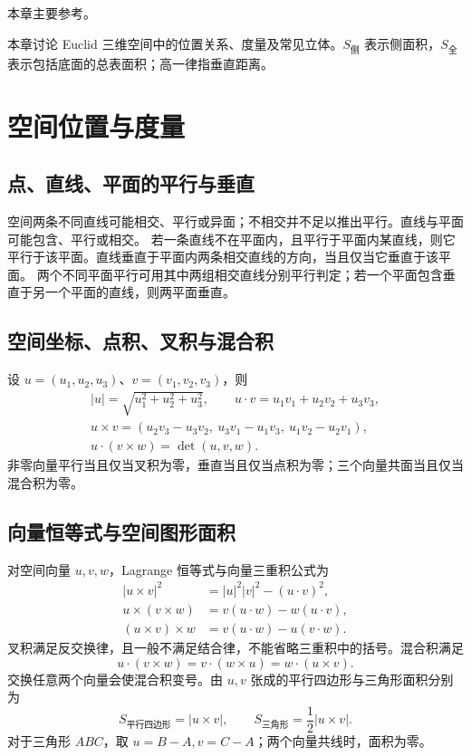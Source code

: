 \documentclass[../main.tex]{subfiles}
\begin{document}
本章主要参考\cite{euclid,geometry,matrix}。

本章讨论 Euclid 三维空间中的位置关系、度量及常见立体。$S_{\text{侧}}$ 表示侧面积，$S_{\text{全}}$ 表示包括底面的总表面积；高一律指垂直距离。
\section{空间位置与度量}
\subsection{点、直线、平面的平行与垂直}
空间两条不同直线可能相交、平行或异面；不相交并不足以推出平行。直线与平面可能包含、平行或相交。
若一条直线不在平面内，且平行于平面内某直线，则它平行于该平面。直线垂直于平面内两条相交直线的方向，当且仅当它垂直于该平面。
两个不同平面平行可用其中两组相交直线分别平行判定；若一个平面包含垂直于另一个平面的直线，则两平面垂直。
\subsection{空间坐标、点积、叉积与混合积}
设 $u=(u_1,u_2,u_3)$、$v=(v_1,v_2,v_3)$，则
\begin{gather*}
|u|=\sqrt{u_1^2+u_2^2+u_3^2},\qquad u\cdot v=u_1v_1+u_2v_2+u_3v_3,\\
u\times v=(u_2v_3-u_3v_2,\ u_3v_1-u_1v_3,\ u_1v_2-u_2v_1),\\
u\cdot(v\times w)=\det(u,v,w).
\end{gather*}
非零向量平行当且仅当叉积为零，垂直当且仅当点积为零；三个向量共面当且仅当混合积为零。
\subsection{向量恒等式与空间图形面积}
对空间向量 $u,v,w$，Lagrange 恒等式与向量三重积公式为
\begin{align*}
|u\times v|^2&=|u|^2|v|^2-(u\cdot v)^2,\\
u\times(v\times w)&=v(u\cdot w)-w(u\cdot v),\\
(u\times v)\times w&=v(u\cdot w)-u(v\cdot w).
\end{align*}
叉积满足反交换律，且一般不满足结合律，不能省略三重积中的括号。混合积满足
\[
u\cdot(v\times w)=v\cdot(w\times u)=w\cdot(u\times v).
\]
交换任意两个向量会使混合积变号。由 $u,v$ 张成的平行四边形与三角形面积分别为
\[
S_{\text{平行四边形}}=|u\times v|,\qquad
S_{\text{三角形}}=\frac12|u\times v|.
\]
对于三角形 $ABC$，取 $u=B-A,v=C-A$；两个向量共线时，面积为零。
\end{document}
